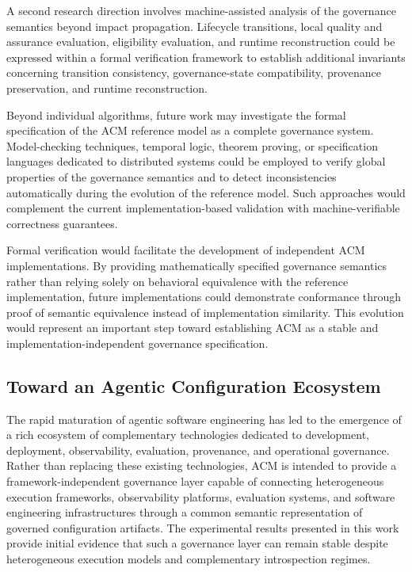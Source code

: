 \documentclass[10pt]{article}
\begin{document}
A second research direction involves machine-assisted analysis of the governance semantics beyond impact propagation. Lifecycle transitions, local quality and assurance evaluation, eligibility evaluation, and runtime reconstruction could be expressed within a formal verification framework to establish additional invariants concerning transition consistency, governance-state compatibility, provenance preservation, and runtime reconstruction.

Beyond individual algorithms, future work may investigate the formal specification of the ACM reference model as a complete governance system. Model-checking techniques, temporal logic, theorem proving, or specification languages dedicated to distributed systems could be employed to verify global properties of the governance semantics and to detect inconsistencies automatically during the evolution of the reference model. Such approaches would complement the current implementation-based validation with machine-verifiable correctness guarantees.

Formal verification would facilitate the development of independent ACM implementations. By providing mathematically specified governance semantics rather than relying solely on behavioral equivalence with the reference implementation, future implementations could demonstrate conformance through proof of semantic equivalence instead of implementation similarity. This evolution would represent an important step toward establishing ACM as a stable and implementation-independent governance specification.

\subsection{Toward an Agentic Configuration Ecosystem}
\label{sec:future_ecosystem}

The rapid maturation of agentic software engineering has led to the emergence of a rich ecosystem of complementary technologies dedicated to development, deployment, observability, evaluation, provenance, and operational governance. Rather than replacing these existing technologies, ACM is intended to provide a framework-independent governance layer capable of connecting heterogeneous execution frameworks, observability platforms, evaluation systems, and software engineering infrastructures through a common semantic representation of governed configuration artifacts. The experimental results presented in this work provide initial evidence that such a governance layer can remain stable despite heterogeneous execution models and complementary introspection regimes.
\end{document}
